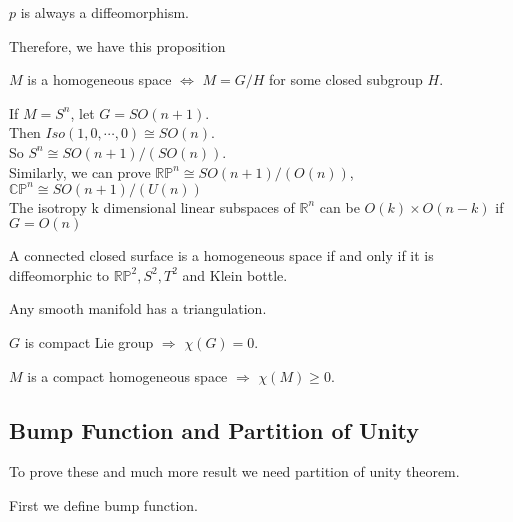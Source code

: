 \begin{theorem}
     $ p  $ is always a diffeomorphism.
\end{theorem}
Therefore, we have this proposition
\begin{proposition}
    $ M  $ is a homogeneous space  $ \Leftrightarrow  $  $ M=G/H  $ for some closed subgroup  $ H  $.
\end{proposition}
\begin{example}
    If  $ M=S^n  $, let  $ G=SO(n+1)  $.\\
    Then  $ Iso(1,0,\cdots,0)\cong SO(n) $.\\
    So  $ S^n\cong SO(n+1)/(SO(n)) $. \\
    Similarly, we can prove  $ \mathbb{RP}^n\cong SO(n+1)/(O(n)) $,  $ \mathbb{CP}^n\cong SO(n+1)/(U(n))$\\
    The isotropy k dimensional linear subspaces of  $ \mathbb{R}^n  $ can be  $ O(k)\times O(n-k) $ if  $ G=O
    (n) $   
\end{example}
A connected closed surface is a homogeneous space if and only if it is diffeomorphic to  $ \mathbb{RP}^2,S^2,T^2 $ and Klein bottle. 
\begin{theorem}[Whithead]
    Any smooth manifold has a triangulation.
\end{theorem}
\begin{theorem}
     $ G  $ is compact Lie group  $ \Rightarrow  $  $ \chi(G)=0 $. 
\end{theorem}
\begin{theorem}[Mostow2005]
     $ M  $ is a compact homogeneous space  $ \Rightarrow  $  $ \chi(M) \geq 0 $. 
\end{theorem}
\subsection{Bump Function and Partition of Unity}
\begin{theorem}[Urysohn smooth version]
    Given  $ M  $, closed disjoint  $ A,B  $,  $ \exists  $ smooth  $ f:M\rightarrow[0,q) $ \st  $ f|_A=0,f|_B=1 $.  
\end{theorem}
To prove these and much more result we need partition of unity theorem.

First we define bump function.

